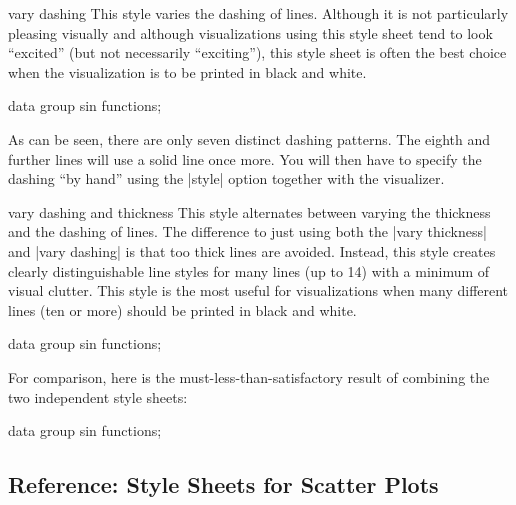 \begin{stylesheet}{vary dashing}
  This style varies the dashing of lines. Although it is not
  particularly pleasing visually and although visualizations using
  this style sheet tend to look ``excited'' (but not necessarily
  ``exciting''), this style sheet is often the best choice when the
  visualization is to be printed in black and white.
\begin{codeexample}[width=10cm]
\tikz \datavisualization [
  visualize as smooth line/.list=
    {1,2,3,4,5,6,7,8},
  example visualization,
  style sheet=vary dashing]
data group {sin functions};
\end{codeexample}
  As can be seen, there are only seven distinct dashing patterns. The
  eighth and further lines will use a solid line once more. You will
  then have to specify the dashing ``by hand'' using the |style|
  option together with the visualizer.
\end{stylesheet}

\begin{stylesheet}{vary dashing and thickness}
  This style alternates between varying the thickness and the dashing
  of lines. The 
  difference to just using both the |vary thickness| and
  |vary dashing| is that too thick lines are avoided. Instead, this
  style creates clearly distinguishable line styles for many lines (up
  to 14) with a minimum of visual clutter. This style is the most
  useful for visualizations when many different lines (ten or more)
  should be printed in black and white.
\begin{codeexample}[width=10cm]
\tikz \datavisualization [
  visualize as smooth line/.list=
    {1,2,3,4,5,6,7,8},
  example visualization,
  style sheet=vary thickness
              and dashing]
data group {sin functions};
\end{codeexample}
  For comparison, here is the must-less-than-satisfactory result of
  combining the two independent style sheets:
\begin{codeexample}[width=10cm]
\tikz \datavisualization [
  visualize as smooth line/.list=
    {1,2,3,4,5,6,7,8},
  example visualization,
  style sheet=vary thickness,
  style sheet=vary dashing]
data group {sin functions};
\end{codeexample}
\end{stylesheet}


\subsection{Reference: Style Sheets for Scatter Plots}

